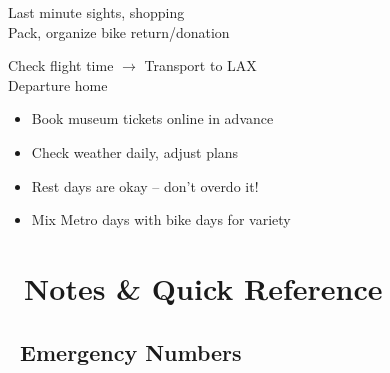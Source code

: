 \documentclass[10pt,letterpaper]{article}
\begin{document}
\begin{small}
\begin{tcolorbox}[colback=primary!5,colframe=primary!50,title=\textbf{Day 16 - Tue, Nov 25: FINAL EXPLORATIONS}]
Last minute sights, shopping\\
Pack, organize bike return/donation
\end{tcolorbox}

\begin{tcolorbox}[colback=primary!5,colframe=primary!50,title=\textbf{Day 17 - Wed, Nov 26: DEPARTURE}]
Check flight time $\rightarrow$ Transport to LAX\\
Departure home
\end{tcolorbox}

\end{small}

\begin{warningbox}[title=\faLightbulb\ Planning Tips:]
\begin{small}
\begin{itemize}[leftmargin=0.2in,itemsep=1pt]
\item Book museum tickets online in advance
\item Check weather daily, adjust plans
\item Rest days are okay -- don't overdo it!
\item Mix Metro days with bike days for variety
\end{itemize}
\end{small}
\end{warningbox}

\newpage


\section*{\faStickyNote\ Notes \& Quick Reference}

\subsection*{\faAmbulance\ Emergency Numbers}

\begin{emergencybox}[title=\faExclamationTriangle\ DIAL 911 FOR ALL EMERGENCIES]
\end{emergencybox}
\end{document}
